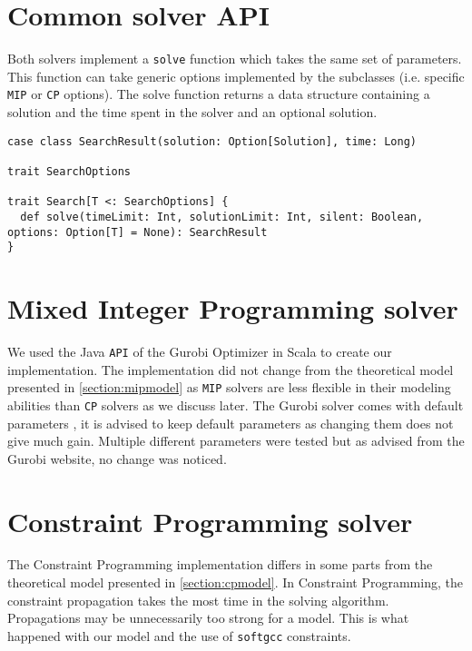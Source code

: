 \documentclass[../thesis.tex]{subfiles}
\begin{document}
\section{Common solver API}

Both solvers implement a \texttt{solve} function which takes the same set of parameters.
This function can take generic options implemented by the subclasses (i.e. specific \texttt{MIP} or \texttt{CP} options).
The solve function returns a data structure containing a solution and the time spent in the solver and an optional solution.

\begin{lstlisting}[style=scalaStyle,caption={Solver \texttt{API}},captionpos=b]
case class SearchResult(solution: Option[Solution], time: Long)

trait SearchOptions

trait Search[T <: SearchOptions] {
  def solve(timeLimit: Int, solutionLimit: Int, silent: Boolean, options: Option[T] = None): SearchResult
}
\end{lstlisting}

\section{Mixed Integer Programming solver}

We used the Java \texttt{API} \cite{gurobi:java} of the Gurobi Optimizer in Scala to create our implementation. 
The implementation did not change from the theoretical model presented in \autoref{section:mipmodel} as 
\texttt{MIP} solvers are less flexible in their modeling abilities than \texttt{CP} solvers as we discuss later. The Gurobi solver 
comes with default parameters \cite{gurobi:parameters}, it is advised to keep default parameters as 
changing them does not give much gain. Multiple different parameters were tested but as advised from the Gurobi website, 
no change was noticed.

\section{Constraint Programming solver}

The Constraint Programming implementation differs in some parts from the theoretical model 
presented in \autoref{section:cpmodel}. In Constraint Programming, the constraint propagation 
takes the most time in the solving algorithm. Propagations may be unnecessarily too strong for a model.
This is what happened with our model and the use of \texttt{softgcc} constraints. 
\end{document}
